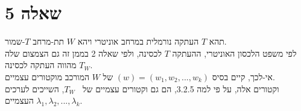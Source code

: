 \documentclass{article}
\DeclareMathOperator{\adj}{^\ast}
\begin{document}
\pagebreak

\section*{שאלה 5}

תהא $T$ העתקה נורמלית במרחב אוניטרי ויהא $W$ תת-מרחב $T$-שמור. \\
לפי משפט הלכסון האוניטרי, ההעתקה $T$ לכסינה, ולפי שאלה 2 בממן זה גם הצמצום שלה $T_W$ מהווה העתקה לכסינה. \\
אי-לכך, קיים בסיס $(w)=(w_1, w_2, ..., w_k)$ של $W$ המורכב מוקטורים עצמיים. \\
וקטורים אלה, על פי למה 3.2.5, הם גם וקטורים עצמיים של $T_W\adj$, השייכים לערכים העצמיים $\lambda_1, \lambda_2, ..., \lambda_k$.
\end{document}
